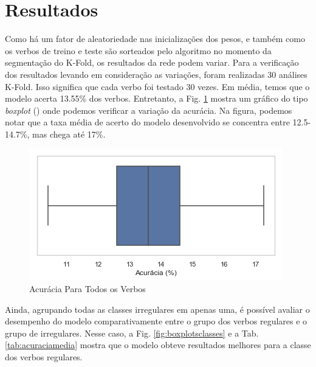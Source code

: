 \section{Resultados}
\label{sec:resultado}
Como há um fator de aleatoriedade nas inicializações dos pesos, e também como os verbos de treino e teste são sorteados pelo algoritmo no momento da segmentação do K-Fold, os resultados da rede podem variar. Para a verificação dos resultados levando em consideração as variações, foram realizadas 30 análises K-Fold. Isso significa que cada verbo foi testado 30 vezes. Em média, temos que o modelo acerta 13.55\% dos verbos. Entretanto, a Fig. \ref{fig:acc} mostra um gráfico do tipo \textit{boxplot} (\cite{2004:bussab}) onde podemos verificar a variação da acurácia. Na figura, podemos notar que a taxa média de acerto do modelo desenvolvido se concentra entre 12.5-14.7\%, mas chega até 17\%.

\begin{figure}[H]
  \centering
  \includegraphics[width=0.6\linewidth]{img/mean_accuracy.png}
  \caption{Acurácia Para Todos os Verbos}
  \label{fig:acc}
\end{figure}

Ainda, agrupando todas as classes irregulares em apenas uma, é possível avaliar o desempenho do modelo comparativamente entre o grupo dos verbos regulares e o grupo de irregulares.
Nesse caso, a Fig. \ref{fig:boxplotsclasses} e a Tab. \ref{tab:acuraciamedia} mostra que o modelo obteve resultados melhores para a classe dos verbos regulares. 

